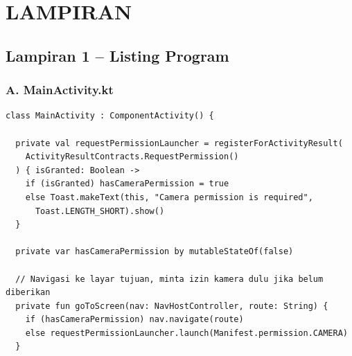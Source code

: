 
\chapter*{LAMPIRAN}
\thispagestyle{chapterpage}

\renewcommand{\thepage}{L-\arabic{page}}
\setcounter{page}{1}

{\fontsize{8}{10}\selectfont\singlespacing

%
%

\section*{Lampiran 1 – Listing Program}

\subsection*{A. MainActivity.kt}

\begin{lstlisting}[caption={Entry point aplikasi dan konfigurasi navigasi antar layar}, label={lst:mainactivity}]
class MainActivity : ComponentActivity() {

  private val requestPermissionLauncher = registerForActivityResult(
    ActivityResultContracts.RequestPermission()
  ) { isGranted: Boolean ->
    if (isGranted) hasCameraPermission = true
    else Toast.makeText(this, "Camera permission is required",
      Toast.LENGTH_SHORT).show()
  }

  private var hasCameraPermission by mutableStateOf(false)

  // Navigasi ke layar tujuan, minta izin kamera dulu jika belum diberikan
  private fun goToScreen(nav: NavHostController, route: String) {
    if (hasCameraPermission) nav.navigate(route)
    else requestPermissionLauncher.launch(Manifest.permission.CAMERA)
  }


\end{lstlisting}}
